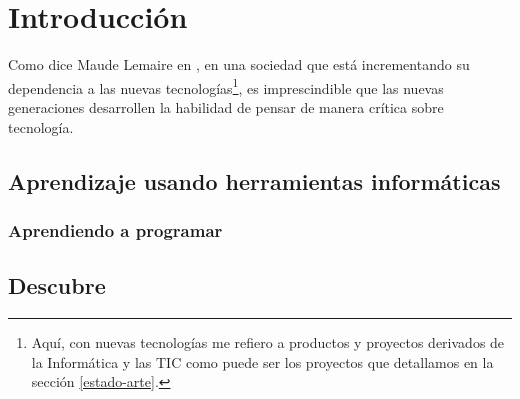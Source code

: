 \chapter{Introducción}\label{introduccion}

Como dice Maude Lemaire en \cite{lemaire2014incorporating}, en una sociedad que está incrementando su dependencia a las nuevas tecnologías\footnote{Aquí, con nuevas tecnologías me refiero a productos y proyectos derivados de la Informática y las \acrfull{TIC} como puede ser los proyectos que detallamos en la sección \ref{estado-arte}.}, es imprescindible que las nuevas generaciones desarrollen la habilidad de pensar de manera crítica sobre tecnología.







\section{Aprendizaje usando herramientas informáticas}
\label{sec:aprendizaje}

\subsection{Aprendiendo a programar}
\label{sub:aprendiendo-programar}

\section{Descubre}
\label{sec:descubre}



